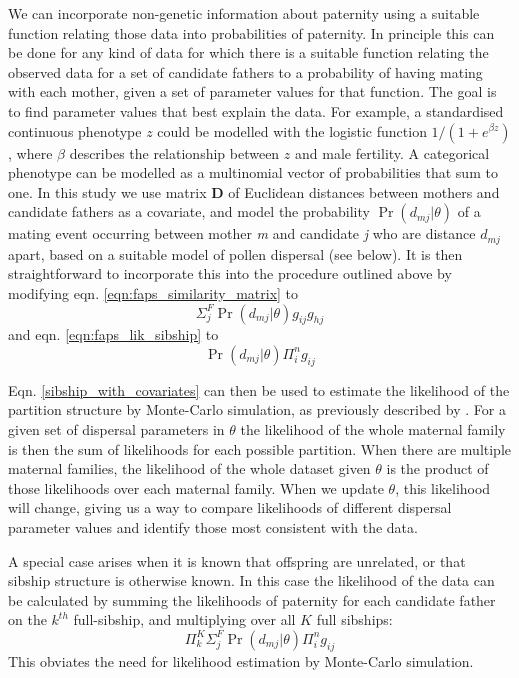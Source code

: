 \documentclass[10pt, a4paper, twocolumn]{article} %
\begin{document}
We can incorporate non-genetic information about paternity using a suitable function relating those data into probabilities of paternity.
In principle this can be done for any kind of data for which there is a suitable function relating the observed data for a set of candidate fathers to a probability of having mating with each mother, given a set of parameter values for that function. The goal is to find parameter values that best explain the data. For example, a standardised continuous phenotype $z$ could be modelled with the logistic function $1/(1+e^{\beta z})$, where $\beta$ describes the relationship between $z$ and male fertility. A categorical phenotype can be modelled as a multinomial vector of probabilities that sum to one. In this study we use matrix \textbf{D} of Euclidean distances between mothers and candidate fathers as a covariate, and model the probability $\Pr(d_{mj}|\theta)$ of a mating event occurring between mother \textit{m} and candidate \textit{j} who are distance $d_{mj}$ apart, based on a suitable model of pollen dispersal (see below). It is then straightforward to incorporate this into the procedure outlined above by modifying eqn. \ref{eqn:faps_similarity_matrix} to
\begin{equation}\label{eqn:pairwise_with_covariates}
\Sigma_j^F \Pr(d_{mj} | \theta)g_{ij}g_{hj}
\end{equation}
and eqn. \ref{eqn:faps_lik_sibship} to
\begin{equation}
\label{sibship_with_covariates}
\Pr(d_{mj} | \theta)\Pi_i^n g_{ij}
\end{equation}

Eqn. \ref{sibship_with_covariates} can then be used to estimate the likelihood of the partition structure by Monte-Carlo simulation, as previously described by \textcite{ellis2018efficient}.
For a given set of dispersal parameters in $\theta$ the likelihood of the whole maternal family is then the sum of likelihoods for each possible partition. When there are multiple maternal families, the likelihood of the whole dataset given $\theta$ is the product of those likelihoods over each maternal family. When we update $\theta$, this likelihood will change, giving us a way to compare likelihoods of different dispersal parameter values and identify those most consistent with the data.

A special case arises when it is known that offspring are unrelated, or that sibship structure is otherwise known. In this case the likelihood of the data can be calculated by summing the likelihoods of paternity for each candidate father on the $k^{th}$ full-sibship, and multiplying over all $K$ full sibships:
\begin{equation}
    \label{eqn:lik_if_no_structure}
    \Pi_k^K\Sigma_j^F\Pr(d_{mj} | \theta)\Pi_i^n g_{ij}
\end{equation}
This obviates the need for likelihood estimation by Monte-Carlo simulation.
\end{document}
